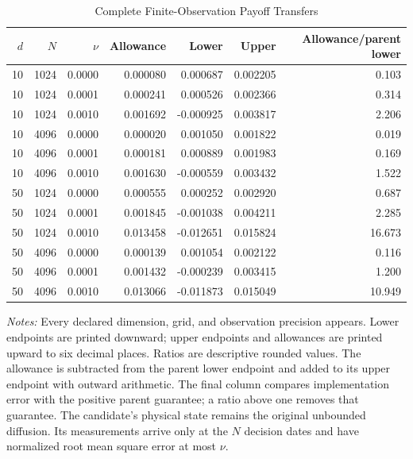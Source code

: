 \begin{table}[!htbp]
\centering
\caption{Complete Finite-Observation Payoff Transfers}
\label{tab:r15observationfull}
\footnotesize
\begin{tabular}{rrrrrrr}
\toprule
$d$ & $N$ & $\nu$ & Allowance & Lower & Upper & Allowance/parent lower \\
\midrule
10 & 1024 & 0.0000 & 0.000080 & 0.000687 & 0.002205 & 0.103 \\
10 & 1024 & 0.0001 & 0.000241 & 0.000526 & 0.002366 & 0.314 \\
10 & 1024 & 0.0010 & 0.001692 & -0.000925 & 0.003817 & 2.206 \\
10 & 4096 & 0.0000 & 0.000020 & 0.001050 & 0.001822 & 0.019 \\
10 & 4096 & 0.0001 & 0.000181 & 0.000889 & 0.001983 & 0.169 \\
10 & 4096 & 0.0010 & 0.001630 & -0.000559 & 0.003432 & 1.522 \\
50 & 1024 & 0.0000 & 0.000555 & 0.000252 & 0.002920 & 0.687 \\
50 & 1024 & 0.0001 & 0.001845 & -0.001038 & 0.004211 & 2.285 \\
50 & 1024 & 0.0010 & 0.013458 & -0.012651 & 0.015824 & 16.673 \\
50 & 4096 & 0.0000 & 0.000139 & 0.001054 & 0.002122 & 0.116 \\
50 & 4096 & 0.0001 & 0.001432 & -0.000239 & 0.003415 & 1.200 \\
50 & 4096 & 0.0010 & 0.013066 & -0.011873 & 0.015049 & 10.949 \\
\bottomrule
\end{tabular}
\begin{minipage}{0.98\linewidth}\footnotesize
\emph{Notes:} Every declared dimension, grid, and observation precision appears.
Lower endpoints are printed downward; upper endpoints and allowances are printed
upward to six decimal places. Ratios are descriptive rounded values.
The allowance is subtracted from the parent lower endpoint and added to its upper
endpoint with outward arithmetic. The final column compares implementation error
with the positive parent guarantee; a ratio above one removes that guarantee.
The candidate's physical state remains the original unbounded diffusion. Its
measurements arrive only at the $N$ decision dates and have normalized root mean
square error at most $\nu$.
\end{minipage}
\end{table}
